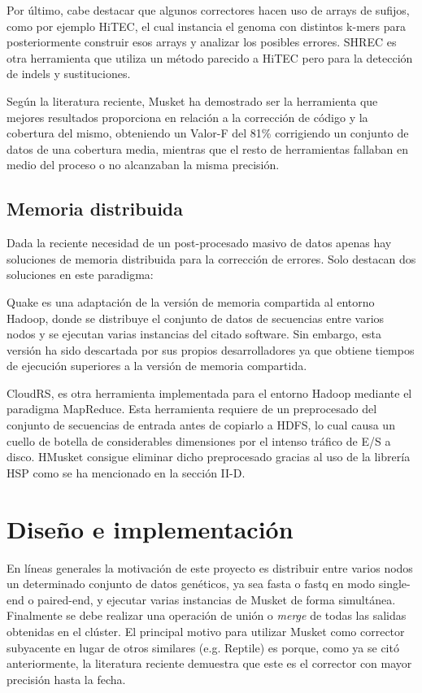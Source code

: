 \documentclass[conference]{IEEEtran}
\begin{document}
Por último, cabe destacar que algunos correctores hacen uso de arrays de sufijos, como por ejemplo HiTEC\cite{hitec}, el cual instancia el genoma con distintos k-mers para posteriormente construir esos arrays y analizar los posibles errores. SHREC\cite{sherec} es otra herramienta que utiliza un método parecido a HiTEC pero para la detección de indels\cite{indels} y sustituciones.

Según la literatura reciente\cite{comparative}, Musket ha demostrado ser la herramienta que mejores resultados proporciona en relación a la corrección de código y la cobertura del mismo, obteniendo un Valor-F del 81\% corrigiendo un conjunto de datos de una cobertura media, mientras que el resto de herramientas fallaban en medio del proceso o no alcanzaban la misma precisión.

\subsection{Memoria distribuida}
Dada la reciente necesidad de un post-procesado masivo de datos apenas hay soluciones de memoria distribuida para la corrección de errores. Solo destacan dos soluciones en este paradigma:

Quake es una adaptación de la versión de memoria compartida al entorno Hadoop, donde se distribuye el conjunto de datos de secuencias entre varios nodos y se ejecutan varias instancias del citado software. Sin embargo, esta versión ha sido descartada por sus propios desarrolladores ya que obtiene tiempos de ejecución superiores a la versión de memoria compartida.

CloudRS\cite{cloudrs}, es otra herramienta implementada para el entorno Hadoop mediante el paradigma MapReduce. Esta herramienta requiere de un preprocesado del conjunto de secuencias de entrada antes de copiarlo a HDFS, lo cual causa un cuello de botella de considerables dimensiones por el intenso tráfico de E/S a disco. HMusket consigue eliminar dicho preprocesado gracias al uso de la librería HSP\cite{hsp} como se ha mencionado en la sección II-D.

\section{Diseño e implementación}

En líneas generales la motivación de este proyecto es distribuir entre varios nodos un determinado conjunto de datos genéticos, ya sea fasta o fastq en modo single-end o paired-end, y ejecutar varias instancias de Musket de forma simultánea. Finalmente se debe realizar una operación de unión o \textit{merge} de todas las salidas obtenidas en el clúster.
El principal motivo para utilizar Musket como corrector subyacente en lugar de otros similares (e.g. Reptile) es porque, como ya se citó anteriormente, la literatura reciente demuestra que este es el corrector con mayor precisión hasta la fecha.
\end{document}
